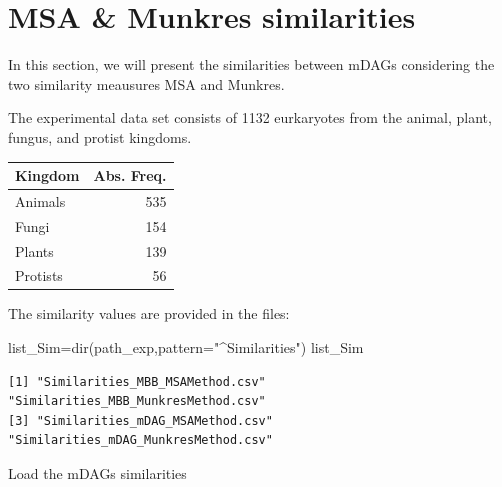 \documentclass[
  letterpaper,
  DIV=11,
  numbers=noendperiod]{scrreprt}
\newenvironment{Shaded}{}{}
\newcommand{\AttributeTok}[1]{\textcolor[rgb]{0.78,0.47,0.87}{#1}}
\newcommand{\DecValTok}[1]{\textcolor[rgb]{0.82,0.60,0.40}{#1}}
\newcommand{\FunctionTok}[1]{\textcolor[rgb]{0.38,0.69,0.94}{#1}}
\newcommand{\NormalTok}[1]{\textcolor[rgb]{0.67,0.70,0.75}{#1}}
\newcommand{\OtherTok}[1]{\textcolor[rgb]{0.15,0.68,0.38}{#1}}
\newcommand{\SpecialCharTok}[1]{\textcolor[rgb]{0.34,0.71,0.76}{#1}}
\newcommand{\StringTok}[1]{\textcolor[rgb]{0.60,0.76,0.47}{#1}}
\begin{document}
\hypertarget{msa-munkres-similarities}{%
\section{MSA \& Munkres similarities}\label{msa-munkres-similarities}}

In this section, we will present the similarities between mDAGs
considering the two similarity meausures MSA and Munkres.

The experimental data set consists of 1132 eurkaryotes from the animal,
plant, fungus, and protist kingdoms.

\begin{tabular}{l|r}
\hline
Kingdom & Abs. Freq.\\
\hline
Animals & 535\\
\hline
Fungi & 154\\
\hline
Plants & 139\\
\hline
Protists & 56\\
\hline
\end{tabular}

The similarity values are provided in the files:

\begin{Shaded}
\begin{Highlighting}[]
\NormalTok{list\_Sim}\OtherTok{=}\FunctionTok{dir}\NormalTok{(path\_exp,}\AttributeTok{pattern=}\StringTok{"\^{}Similarities"}\NormalTok{)}
\NormalTok{list\_Sim}
\end{Highlighting}
\end{Shaded}

\begin{verbatim}
[1] "Similarities_MBB_MSAMethod.csv"      "Similarities_MBB_MunkresMethod.csv" 
[3] "Similarities_mDAG_MSAMethod.csv"     "Similarities_mDAG_MunkresMethod.csv"
\end{verbatim}

Load the mDAGs similarities

\begin{Shaded}
\end{Shaded}
\end{document}
